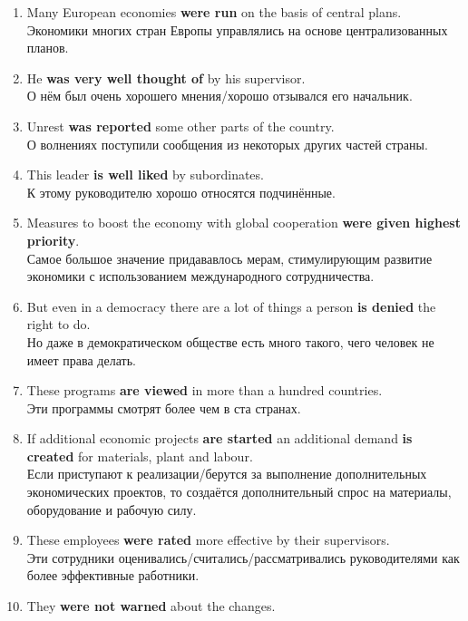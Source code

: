\documentclass[main.tex]{subfiles}
\begin{document}

\begin{enumerate}[nosep,leftmargin=*]
	\itemsep\eitsp
	\item Many European economies \textbf{were run} on the basis of central plans.\\
	Экономики многих стран Европы управлялись на основе централизованных планов.
	\item He \textbf{was very well thought of} by his supervisor.\\
	О нём был очень хорошего мнения/хорошо отзывался его начальник.
	\item Unrest \textbf{was reported} some other parts of the country.\\
	О волнениях поступили сообщения из некоторых других частей страны.
	\item This leader \textbf{is well liked} by subordinates.\\
	К этому руководителю хорошо относятся подчинённые.
	\item Measures to boost the economy with global cooperation \textbf{were given highest priority}.\\
	Самое большое значение придававлось мерам, стимулирующим развитие экономики с использованием международного сотрудничества.
	\item But even in a democracy there are a lot of things a person \textbf{is denied} the right to do.\\
	Но даже в демократическом обществе есть много такого, чего человек не имеет права делать.
	\item These programs \textbf{are viewed} in more than a hundred countries.\\
	Эти программы смотрят более чем в ста странах.
	\item If additional economic projects \textbf{are started} an additional demand \textbf{is created} for materials, plant and labour.\\
	Если приступают к реализации/берутся за выполнение дополнительных экономических проектов, то создаётся дополнительный спрос на материалы, оборудование и рабочую силу.
	\item These employees \textbf{were rated} more effective by their supervisors.\\
	Эти сотрудники оценивались/считались/рассматривались руководителями как более эффективные работники.
	\item They \textbf{were not warned} about the changes.\\

\end{enumerate}
\end{document}

